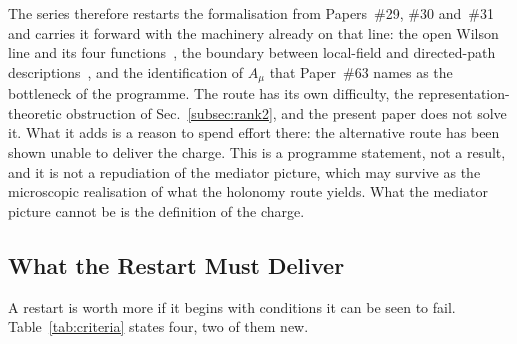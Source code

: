 \documentclass[%
 reprint, amsmath,amssymb, aps, prb, ]{revtex4-2}
\numberwithin{equation}{section}
\begin{document}
The series therefore restarts the formalisation from Papers~\#29, \#30 and~\#31 and carries it forward with the machinery already on that line: the open Wilson line and its four functions~\cite{hanamura55}, the boundary between local-field and directed-path descriptions~\cite{hanamura56}, and the identification of $A_\mu$ that Paper~\#63 names as the bottleneck of the programme. The route has its own difficulty, the representation-theoretic obstruction of Sec.~\ref{subsec:rank2}, and the present paper does not solve it. What it adds is a reason to spend effort there: the alternative route has been shown unable to deliver the charge. This is a programme statement, not a result, and it is not a repudiation of the mediator picture, which may survive as the microscopic realisation of what the holonomy route yields. What the mediator picture cannot be is the definition of the charge.

\subsection{What the Restart Must Deliver}
\label{subsec:acceptance}

A restart is worth more if it begins with conditions it can be seen to fail. Table~\ref{tab:criteria} states four, two of them new.
\end{document}
